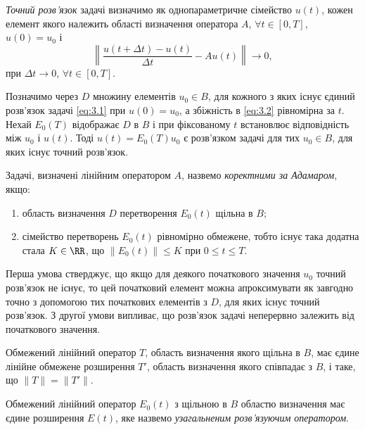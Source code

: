 \begin{definition}
    \textit{Точний розв'язок} задачі визначимо як однопараметричне сімейство $u(t)$, кожен елемент якого належить області визначення оператора $A$, $\forall t \in [0, T]$, $u(0) = u_0$ і
    \begin{equation}
        \label{eq:3.2}
        \left\| \frac{u(t + \Delta t) - u(t)}{\Delta t} - A u(t) \right\| \to 0,
    \end{equation}
    при $\Delta t \to 0$, $\forall t \in [0, T]$.
\end{definition}

Позначимо через $D$ множину елементів $u_0 \in B$, для кожного з яких існує єдиний розв'язок задачі \eqref{eq:3.1} при $u(0) = u_0$, а збіжність в \eqref{eq:3.2} рівномірна за $t$. Нехай $E_0(T)$ відображає $D$ в $B$ і при фіксованому $t$ встановлює відповідність між $u_0$ і $u(t)$. Тоді $u(t) = E_0(T) u_0$ є розв'язком задачі для тих $u_0 \in B$, для яких існує точний розв'язок.

\begin{definition}
    Задачі, визначені лінійним оператором $A$, назвемо \textit{коректними за Адамаром}, якщо: 
    \begin{enumerate}
        \item область визначення $D$ перетворення $E_0(t)$ щільна в $B$;
        \item сімейство перетворень $E_0(t)$ рівномірно обмежене, тобто існує така додатна стала $K \in \RR$, що $\|E_0(t)\| \le K$ при $0 \le t \le T$. 
    \end{enumerate}
\end{definition}

Перша умова стверджує, що якщо для деякого початкового значення $u_0$ точний розв'язок не існує, то цей початковий елемент можна апроксимувати як завгодно точно з допомогою тих початкових елементів з $D$, для яких існує точний розв'язок. З другої умови випливає, що розв'язок задачі неперервно залежить від початкового значення. \medskip

\begin{theorem}
    Обмежений лінійний оператор $T$, область визначення якого щільна в $B$, має єдине лінійне обмежене розширення $T'$, область визначення якого співпадає з $B$, і таке, що $\|T\| = \|T'\|$.
\end{theorem}

\begin{definition}
    Обмежений лінійний оператор $E_0(t)$ з щільною в $B$ областю визначення має єдине розширення $E(t)$, яке назвемо \textit{узагальненим розв'язуючим оператором}.
\end{definition}

